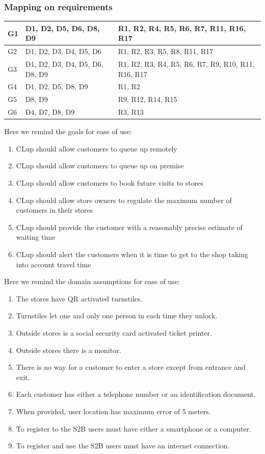 \subsubsection{Mapping on requirements}
\begin{tabular}{ | m{3cm} | m{5cm} | m{9cm} | }
	\hline
	G1 & D1, D2, D5, D6, D8, D9 & R1, R2, R4, R5, R6, R7, R11, R16, R17\\
	\hline
	G2 & D1, D2, D3, D4, D5, D6 & R1, R2, R3, R5, R8, R11, R17\\
	\hline
	G3 & D1, D2, D3, D4, D5, D6, D8, D9 & R1, R2, R3, R4, R5, R6, R7, R9, R10, R11, R16, R17\\
	\hline
	G4 & D1, D2, D5, D8, D9 & R1, R2 \\
	\hline
	G5 & D8, D9 & R9, R12, R14, R15\\
	\hline
	G6 & D4, D7, D8, D9 & R3, R13\\
	\hline
\end{tabular}
\newpage
Here we remind the goals for ease of use:
\begin{enumerate}[label=G\arabic*]
	\item CLup should allow customers to queue up remotely
	\item CLup should allow customers to queue up on premise
	\item CLup should allow customers to book future visits to stores
	\item CLup should allow store owners to regulate the maximum number of customers in their stores
	\item CLup should provide the customer with a reasonably precise estimate of waiting time
	\item CLup should alert the customers when it is time to get to the shop taking into account travel time
\end{enumerate}

Here we remind the domain assumptions for ease of use:
\begin{enumerate}[label=D\arabic*]
	\item The stores have QR activated turnstiles.
	\item Turnstiles let one and only one person in each time they unlock.
	\item Outside stores is a social security card activated ticket printer.
	\item Outside stores there is a monitor.
	\item There is no way for a customer to enter a store except from entrance and exit.
	\item Each customer has either a telephone number or an identification document.
	\item When provided, user location has maximum error of 5 meters.
	\item To register to the S2B users must have either a smartphone or a computer.
	\item To register and use the S2B users must have an internet connection.
\end{enumerate}
